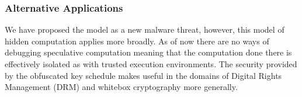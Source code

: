 \subsubsection{Alternative Applications}
We have proposed the \speculake model as a new malware threat, however, this model
of hidden computation applies more broadly. As of now there are no ways of 
debugging speculative computation meaning that the computation done there is effectively
isolated as with trusted execution environments. The security provided by the obfuscated 
key schedule makes \speculake useful in the domains of Digital Rights Management (DRM)
and whitebox cryptography more generally. 



